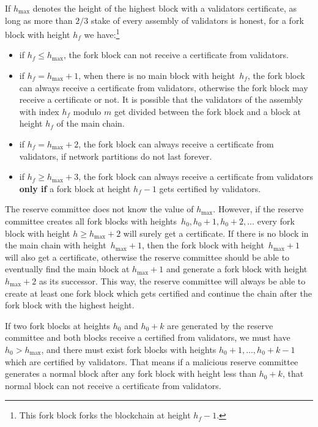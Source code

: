 If $h_{\max}$ denotes the height of the highest block with a validators certificate, as long as more than $2/3$ stake
of every assembly of validators is honest, for a fork block with height $h_f$ we have:\footnote{This fork block
forks the blockchain at height $h_f-1$.}
\begin{itemize}
    \item if $h_f \leq h_{\max}$, the fork block can not receive a certificate from validators.
    \item if $h_f = h_{\max} + 1$, when there is no main block with height~$h_f$, the fork block can always receive a
    certificate from validators, otherwise the fork block may receive a certificate or not. It is possible that
    the validators of the assembly with index $h_f$ modulo $m$ get divided between the fork block and a block at
    height $h_f$ of the main chain.
    \item if $h_f = h_{\max} + 2$, the fork block can always receive a certificate from validators, if network
    partitions do not last forever.
    \item if $h_f \geq h_{\max} + 3$, the fork block can always receive a certificate from validators \textbf{only if} a
    fork block at height $h_f-1$ gets certified by validators.
\end{itemize}

The reserve committee does not know the value of $h_{\max}$. However, if the reserve committee creates all fork blocks
with heights~$h_0,h_0+1,h_0+2,\dots$ every fork block with height $h \geq h_{\max} + 2$ will surely get a certificate.
If there is no block in the main chain with height~$h_{\max} + 1$, then the fork block with height~$h_{\max} +
1$ will also get a certificate, otherwise the reserve committee should be able to eventually find the main block
at $h_{\max}+1$ and generate a fork block with height~$h_{\max} + 2$ as its successor. This way, the reserve
committee will always be able to create at least one fork block which gets certified and continue the chain after the
fork block with the highest height.

If two fork blocks at heights $h_0$ and $h_0+k$ are generated by the reserve committee and both blocks receive a
certified from validators, we must have $h_0 > h_{\max}$, and there must exist fork blocks with heights
$h_0+1,\dots,h_0+k-1$ which are certified by validators. That means if a malicious reserve committee generates a normal
block after any fork block with height less than $h_0+k$, that normal block can not receive a certificate from
validators.

